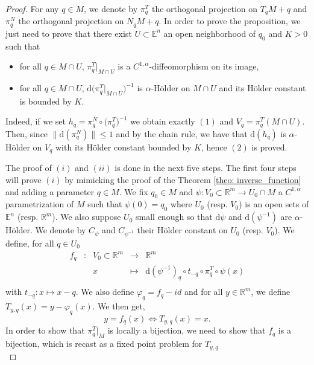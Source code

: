 \documentclass[11pt,reqno,a4paper]{article}%
\theoremstyle{definition}
\theoremstyle{remark}
\renewcommand{\leq}{\leqslant}
\renewcommand{\d}{\mathrm{d}}
\newcommand{\R}{\mathbb{R}}
\newcommand{\E}{\mathbb{E}}
\renewcommand{\d}{\mathrm{d}}
\begin{document}
\begin{proof}
    For any $q \in M$, we denote by $\pi_{q}^T$ the orthogonal projection on $T_q M + q$ and  $\pi_{q}^N$ the orthogonal projection on $N_q M + q$. In order to prove the proposition, we just need to prove that
    there exist $U \subset \E^n$ an open neighborhood of $q_0$ and $K > 0$ such that 
    \begin{itemize}
        \item[(i)] for all $q \in  M \cap U$, $\pi_{q}^T |_{M\cap U}$ is a $C^{1,\alpha}$-diffeomorphism on its image,
        \item[(ii)] for all $q \in  M \cap U$, $\d \big( \pi_{q}^T |_{M\cap U} \big)^{-1}$ is $\alpha$-Hölder on $M \cap U$ and its Hölder constant is bounded by $K$.
    \end{itemize}
    Indeed, if we set $h_{q} = \pi_{q}^N \circ \big( \pi_{q}^T \big)^{-1}$ we obtain exactly $(1)$ and $V_q  = \pi_{q}^T(M\cap U)$.
    Then, since $\| \d (\pi^N_{q})\| \leq 1$ and by the chain rule, we have that $\d (h_{q})$ is $\alpha$-Hölder on $V_{q}$ with its Hölder constant bounded by $K$, hence $(2)$ is proved.
    
    The proof of $(i)$ and $(ii)$ is done in the next five steps.
    The first four steps will prove $(i)$ by mimicking the proof of the Theorem \ref{theo: inverse_function} and adding a parameter $q\in M.$
    We fix $q_0 \in M$ and $\psi : V_0 \subset \R^m \to U_0 \cap M$ a $C^{1,\alpha}$ parametrization of $M$ such that $\psi(0) = q_0$ where $U_0$ (resp. $V_0$) is an open sets of $\E^n$ (resp. $\R^m$).
    We also suppose $U_0$ small enough so that $\d \psi$ and $\d (\psi^{-1})$ are $\alpha$-Hölder.
    We denote by $C_{\psi}$ and $C_{\psi^{-1}}$ their Hölder constant on $U_0$ (resp. $V_0$).
    We define, for all $q \in U_0$
    \[ \begin{array}{ccccc}
    f_q & : & V_0 \subset \R^m & \longrightarrow & \R^m \\
     & & x & \longmapsto & \d (\psi^{-1})_{q} \circ t_{-q}  \circ \pi_{q}^T \circ \psi(x) \\
    \end{array}\]
    with $t_{-q} : x \mapsto x - q$.
    We also define $\varphi_{q} = f_{q} - id$ and
    for all $y \in \R^m$, we define $T_{y,q}(x) = y -\varphi_{q}(x)$. 
    We then get,
    $$ y = f_{q}(x) \iff T_{y,q}(x) = x.$$
    In order to show that $\pi_q^T |_M$ is locally a bijection, we need to show that $f_q$ is a bijection, which is recast as a fixed point problem for $T_{y,q}$\\
    

\end{proof}
\end{document}
